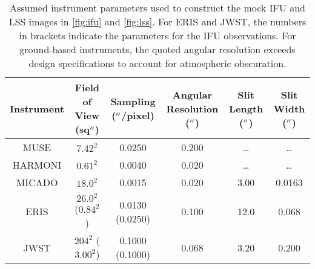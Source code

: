 \documentclass[twocolumn]{aastex631}
\begin{document}
\begin{table*}
    \centering
    \begin{tabular}{c|c|c|c|c|c}
    \hline\hline
        Instrument & Field of View (sq$\mbox{$^{\prime\prime}$}$) & Sampling ($\mbox{$^{\prime\prime}$}$/pixel) & Angular Resolution ($\mbox{$^{\prime\prime}$}$) & Slit Length ($\mbox{$^{\prime\prime}$}$) & Slit Width ($\mbox{$^{\prime\prime}$}$) \\
        \hline 
        MUSE & $7.42^2$ & 0.0250 & 0.200 & \dots & \dots \\
        HARMONI & $0.61^2$ & 0.0040  & 0.020 & \dots & \dots \\
        MICADO & $18.0^2$ & 0.0015 & 0.020 & 3.00 & 0.0163\\
        ERIS & $26.0^2$ ($0.84^2$) & 0.0130 (0.0250) & 0.100 & 12.0 & 0.068\\
        JWST & $204^2$ ($3.00^2$) & 0.1000 (0.1000) & 0.068 & 3.20 & 0.200\\
        \hline
    \end{tabular}
    \caption{
        Assumed instrument parameters used to construct the mock IFU and LSS images in \autoref{fig:ifu} and \autoref{fig:lss}.
        For ERIS and JWST, the numbers in brackets indicate the parameters for the IFU observations.
        For ground-based instruments, the quoted angular resolution exceeds design specifications to account for atmospheric obscuration.
    }
    \label{tab:instruments}
\end{table*}
\end{document}
